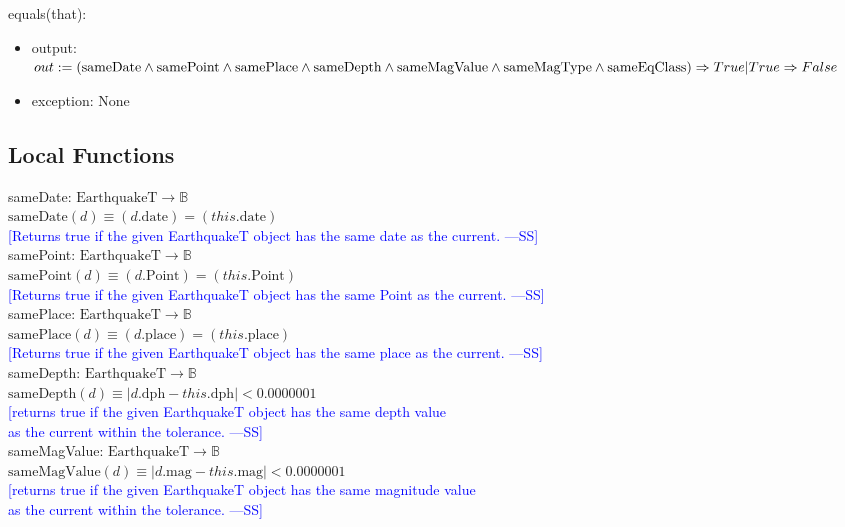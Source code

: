 \documentclass[12pt]{article}
\newcommand{\authornote}[3]{\textcolor{#1}{[#3 ---#2]}}
\newcommand{\authornote}[3]{}
\newcommand{\wss}[1]{\authornote{blue}{SS}{#1}}
\begin{document}
\noindent equals(that):
\begin{itemize}
\item output: $out := ( \mbox{sameDate} \wedge \mbox{samePoint} \wedge \mbox{samePlace}\\
 \wedge \mbox{sameDepth} \wedge \mbox{sameMagValue} \wedge \mbox{sameMagType} \wedge \\
\mbox{sameEqClass}) \Rightarrow True | True \Rightarrow False$
\item exception: None
\end{itemize}

\newpage

\subsection*{Local Functions}

\noindent sameDate: $\mbox{EarthquakeT} \rightarrow \mathbb{B}$\\
$\mbox{sameDate}(d) \equiv (d.\mbox{date}) = (this.\mbox{date})$\\
\noindent \wss{Returns true if the given EarthquakeT object has the same date as the current.}\\

\noindent samePoint: $\mbox{EarthquakeT} \rightarrow \mathbb{B}$\\
$\mbox{samePoint}(d) \equiv (d.\mbox{Point}) = (this.\mbox{Point})$\\
\noindent \wss{Returns true if the given EarthquakeT object has the same Point as the current.}\\

\noindent samePlace: $\mbox{EarthquakeT} \rightarrow \mathbb{B}$\\
$\mbox{samePlace}(d) \equiv (d.\mbox{place}) = (this.\mbox{place})$\\
\noindent \wss{Returns true if the given EarthquakeT object has the same place as the current.}\\

\noindent sameDepth: $\mbox{EarthquakeT} \rightarrow \mathbb{B}$\\
$\mbox{sameDepth}(d) \equiv |d.\mbox{dph} - this.\mbox{dph}| < 0.0000001$\\
\noindent \wss{returns true if the given EarthquakeT object has the same depth value\\
 as the current within the tolerance.}\\

\noindent sameMagValue: $\mbox{EarthquakeT} \rightarrow \mathbb{B}$\\
$\mbox{sameMagValue}(d) \equiv |d.\mbox{mag} - this.\mbox{mag}| < 0.0000001$\\
\noindent \wss{returns true if the given EarthquakeT object has the same magnitude value\\
 as the current within the tolerance.}\\
\end{document}
